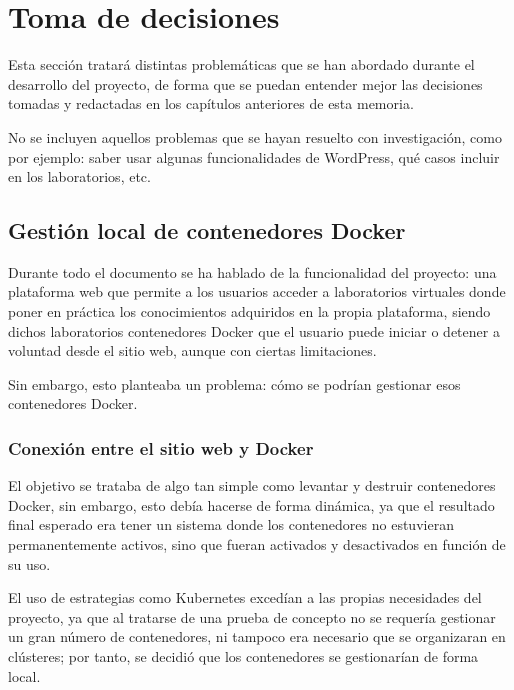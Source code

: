 \chapter{Toma de decisiones}

    Esta sección tratará distintas problemáticas que se han abordado durante el desarrollo del proyecto, de forma que se puedan entender mejor las decisiones tomadas y redactadas en los capítulos anteriores de esta memoria.

    No se incluyen aquellos problemas que se hayan resuelto con investigación, como por ejemplo: saber usar algunas funcionalidades de WordPress, qué casos incluir en los laboratorios, etc.

    \section{Gestión local de contenedores Docker}

        Durante todo el documento se ha hablado de la funcionalidad del proyecto: una plataforma web que permite a los usuarios acceder a laboratorios virtuales donde poner en práctica los conocimientos adquiridos en la propia plataforma, siendo dichos laboratorios contenedores Docker que el usuario puede iniciar o detener a voluntad desde el sitio web, aunque con ciertas limitaciones.
        
        Sin embargo, esto planteaba un problema: cómo se podrían gestionar esos contenedores Docker. 

        \subsection{Conexión entre el sitio web y Docker}

            El objetivo se trataba de algo tan simple como levantar y destruir contenedores Docker, sin embargo, esto debía hacerse de forma dinámica, ya que el resultado final esperado era tener un sistema donde los contenedores no estuvieran permanentemente activos, sino que fueran activados y desactivados en función de su uso.
            
            El uso de estrategias como Kubernetes excedían a las propias necesidades del proyecto, ya que al tratarse de una prueba de concepto no se requería gestionar un gran número de contenedores, ni tampoco era necesario que se organizaran en clústeres; por tanto, se decidió que los contenedores se gestionarían de forma local.

